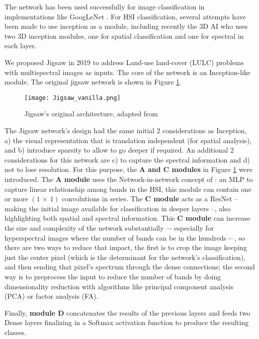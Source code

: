 \documentclass[lettersize, journal]{IEEEtran}
\begin{document}
The network has been used successfully for image classification in implementations like GoogLeNet \cite{szegedy_going_2015}. For HSI classification, several attempts have been made to use inception as a module, including recently the 3D AI \cite{fang_hyperspectral_2022} who uses two 3D inception modules, one for spatial classification and one for spectral in each layer.

We proposed Jigsaw in 2019 \cite{moraga_jigsaw_2019} to address Land-use land-cover (LULC) problems with multispectral images as inputs. The core of the network is an Inception-like module. The original jigsaw network is shown in Figure \ref{fig:Jigsaw}.

\begin{figure}[!htb]
    \centering
    \texttt{[image: Jigsaw\_vanilla.png]}
    \caption{Jigsaw's original architecture, adapted from \cite{moraga_monitoring_2020}}
    \label{fig:Jigsaw}
\end{figure}

The Jigsaw network’s design had the same initial 2 considerations as Inception, a) the visual representation that is translation independent (for spatial analysis), and b) introduce sparsity to allow to go deeper if required. An additional 2 considerations for this network are c) to capture the spectral information and d) not to lose resolution. For this purpose, the \textbf{A and C modules} in Figure \ref{fig:Jigsaw} were introduced. The \textbf{A module} uses the Network-in-network concept of \cite{lin_network_2014}: an MLP to capture linear relationship among bands in the HSI, this module can contain one or more  $(1 \, \times \, 1)$ convolutions in series. The \textbf{C module} acts as a ResNet \cite{he_deep_2016} -- making the initial image available for classification in deeper layers --, also highlighting both spatial and spectral information. This \textbf{C module} can increase the size and complexity of the network substantially  –- especially for hyperspectral images where the number of bands can be in the hundreds -–, so there are two ways to reduce that impact, the first is to crop the image keeping just the center pixel (which is the determinant for the network’s classification), and then sending that pixel’s spectrum through the dense connections; the second way is to preprocess the input to reduce the number of bands by doing dimensionality reduction with algorithms like principal component analysis (PCA) or factor analysis (FA).

Finally, \textbf{module D} concatenates the results of the previous layers and feeds two Dense layers finalizing in a Softmax activation function to produce the resulting classes.
\end{document}
